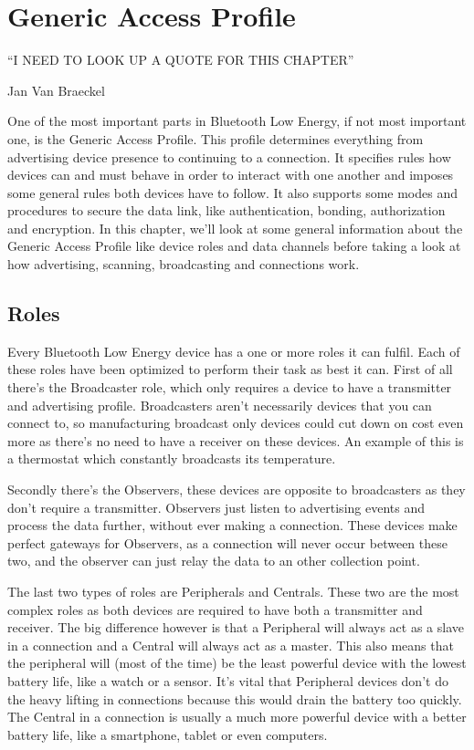 \documentclass[pdftex,a4paper,12pt,twoside]{report}
\begin{document}
\chapter{Generic Access Profile}
\label{ch:gap}
\epigraph{``I NEED TO LOOK UP A QUOTE FOR THIS CHAPTER''}{Jan Van Braeckel}
One of the most important parts in Bluetooth Low Energy, if not most important one, is the Generic Access Profile. This profile determines everything from advertising device presence to continuing to a connection. It specifies rules how devices can and must behave in order to interact with one another and imposes some general rules both devices have to follow. It also supports some modes and procedures to secure the data link, like authentication, bonding, authorization and encryption. In this chapter, we'll look at some general information about the Generic Access Profile like device roles and data channels before taking a look at how advertising, scanning, broadcasting and connections work.

\newpage{}

\section{Roles}
\label{sec:roles}
Every Bluetooth Low Energy device has a one or more roles it can fulfil. Each of these roles have been optimized to perform their task as best it can. First of all there's the Broadcaster role, which only requires a device to have a transmitter and advertising profile. Broadcasters aren't necessarily devices that you can connect to, so manufacturing broadcast only devices could cut down on cost even more as there's no need to have a receiver on these devices. An example of this is a thermostat which constantly broadcasts its temperature.

Secondly there's the Observers, these devices are opposite to broadcasters as they don't require a transmitter. Observers just listen to advertising events and process the data further, without ever making a connection. These devices make perfect gateways for Observers, as a connection will never occur between these two, and the observer can just relay the data to an other collection point.

The last two types of roles are Peripherals and Centrals. These two are the most complex roles as both devices are required to have both a transmitter and receiver. The big difference however is that a Peripheral will always act as a slave in a connection and a Central will always act as a master. This also means that the peripheral will (most of the time) be the least powerful device with the lowest battery life, like a watch or a sensor. It's vital that Peripheral devices don't do the heavy lifting in connections because this would drain the battery too quickly. The Central in a connection is usually a much more powerful device with a better battery life, like a smartphone, tablet or even computers.
\end{document}
